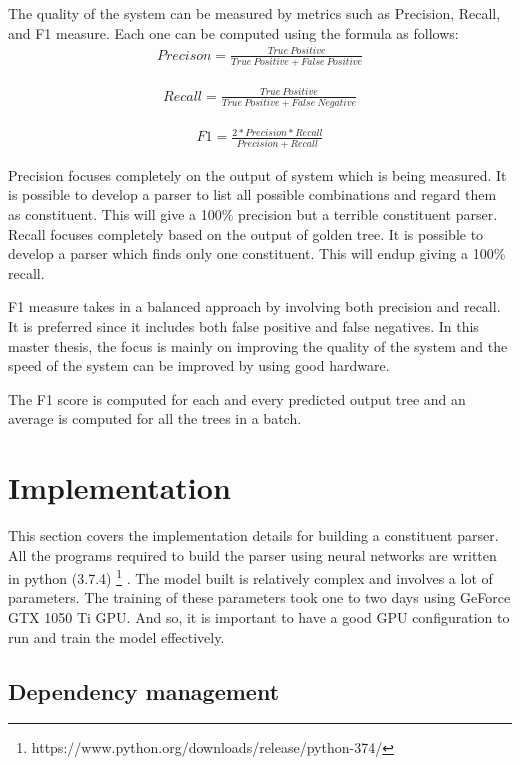 \documentclass[a4paper, 11pt]{article}
\begin{document}
The quality of the system can be measured by metrics such as Precision, Recall, and F1 measure. Each one can be computed using the formula as follows:
\begin{align*}
Precison = \frac{True\ Positive} {True\ Positive + False\ Positive}
\end{align*}

\begin{align*}
Recall = \frac{True\ Positive} {True\ Positive + False\ Negative}
\end{align*}

\begin{align*}
F1 = \frac{2* Precision * Recall} {Precision + Recall}
\end{align*}

Precision focuses completely on the output of system which is being measured. It is possible to develop a parser to list all possible combinations and regard them as constituent. This will give a 100\% precision but a terrible constituent parser. Recall focuses completely based on the output of golden tree. It is possible to develop a parser which finds only one constituent. This will endup giving a 100\% recall.

F1 measure takes in a balanced approach by involving both precision and recall. It is preferred since it includes both false positive and false negatives. In this master thesis, the focus is mainly on improving the quality of the system and the speed of the system can be improved by using good hardware. 

The F1 score is computed for each and every predicted output tree and an average is computed for all the trees in a batch. 

\pagebreak
\section{Implementation}

This section covers the implementation details for building a constituent parser. All the programs required to build the parser using neural networks are written in python (3.7.4) \footnote{https://www.python.org/downloads/release/python-374/} . The model built is relatively complex and involves a lot of parameters. The training of these parameters took one to two days using GeForce GTX 1050 Ti GPU. And so, it is important to have a good GPU configuration to run and train the model effectively. 
\subsection{Dependency management}
\end{document}
